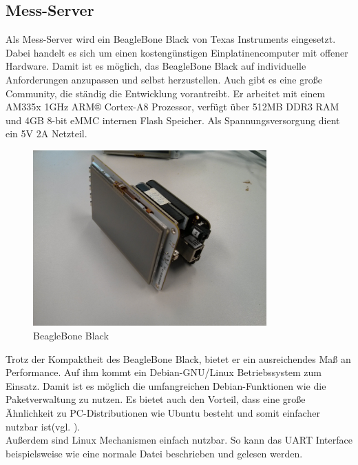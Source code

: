 \subsection{Mess-Server}
\label{section_Mess-Server}

Als Mess-Server wird ein BeagleBone Black von Texas Instruments eingesetzt. Dabei handelt es sich um einen kostengünstigen Einplatinencomputer mit offener Hardware. Damit ist es möglich, das BeagleBone Black auf individuelle Anforderungen anzupassen und selbst herzustellen. Auch gibt es eine große Community, die ständig die Entwicklung vorantreibt.
Er arbeitet mit einem AM335x 1GHz ARM® Cortex-A8 Prozessor, verfügt über 512MB DDR3 RAM und 4GB 8-bit eMMC internen Flash Speicher. Als Spannungsversorgung dient ein 5V 2A Netzteil.


\begin{figure}[H]
\begin{center}
\includegraphics[width=0.8\textwidth]{img/general/BeagleBoneBlack.jpg}
\caption{BeagleBone Black}
\label{figure_Beagleboneblack}
\end{center}
\end{figure}

Trotz der Kompaktheit des BeagleBone Black, bietet er ein ausreichendes Maß an Performance. Auf ihm kommt ein Debian-GNU/Linux Betriebssystem zum Einsatz. Damit ist es möglich die umfangreichen Debian-Funktionen wie die Paketverwaltung zu nutzen. Es bietet auch den Vorteil, dass eine große Ähnlichkeit zu PC-Distributionen wie Ubuntu besteht und somit einfacher nutzbar ist(vgl. \cite{schroeder2009embedded}).\\
Außerdem sind Linux Mechanismen einfach nutzbar. So kann das \ac{UART} Interface beispielsweise wie eine normale Datei beschrieben und gelesen werden.

